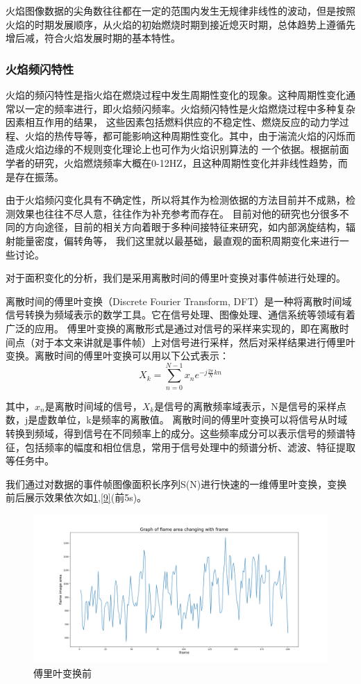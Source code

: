 火焰图像数据的尖角数往往都在一定的范围内发生无规律非线性的波动，但是按照火焰的时期发展顺序，从火焰的初始燃烧时期到接近熄灭时期，总体趋势上遵循先增后减，符合火焰发展时期的基本特性。

\subsubsection{火焰频闪特性}
火焰的频闪特性是指火焰在燃烧过程中发生周期性变化的现象。这种周期性变化通常以一定的频率进行，即火焰频闪频率。火焰频闪特性是火焰燃烧过程中多种复杂因素相互作用的结果，
这些因素包括燃料供应的不稳定性、燃烧反应的动力学过程、火焰的热传导等，都可能影响这种周期性变化。其中，由于湍流火焰的闪烁而造成火焰边缘的不规则变化理论上也可作为火焰识别算法的
一个依据。根据前面学者的研究，火焰燃烧频率大概在0-12HZ，且这种周期性变化并非线性趋势，而是存在振荡。

由于火焰频闪变化具有不确定性，所以将其作为检测依据的方法目前并不成熟，检测效果也往往不尽人意，往往作为补充参考而存在。
目前对他的研究也分很多不同的方向途径，目前的相关方向着眼于多种间接特征来研究，如内部涡旋结构，辐射能量密度，偏转角等，
我们这里就以最基础，最直观的面积周期变化来进行一些讨论。

对于面积变化的分析，我们是采用离散时间的傅里叶变换对事件帧进行处理的。

离散时间的傅里叶变换（Discrete Fourier Transform, DFT）\cite{fly}是一种将离散时间域信号转换为频域表示的数学工具。它在信号处理、图像处理、通信系统等领域有着广泛的应用。
傅里叶变换的离散形式是通过对信号的采样来实现的，即在离散时间点（对于本文来讲就是事件帧）上对信号进行采样，然后对采样结果进行傅里叶变换。离散时间的傅里叶变换可以用以下公式表示：
\begin{equation} 
    X_k=\sum_{n=0}^{N-1}x_n e^{-j\frac{2\pi}{N}kn}
\end{equation}

其中，$x_n$是离散时间域的信号，$X_k$是信号的离散频率域表示，N是信号的采样点数，j是虚数单位，k是频率的离散值。
离散时间的傅里叶变换可以将信号从时域转换到频域，得到信号在不同频率上的成分。这些频率成分可以表示信号的频谱特征，包括频率的幅度和相位信息，常用于信号处理中的频谱分析、滤波、特征提取等任务中。

我们通过对数据的事件帧图像面积长序列S(N)进行快速的一维傅里叶变换，变换前后展示效果依次如\ref{8},\ref{9}(前5s)。
    \begin{figure}[ht]
      \centering
      \includegraphics[width=\textwidth]{figures/extract_flicker_01.png}
      \caption{傅里叶变换前}
      \label{8}
    \end{figure}
    
